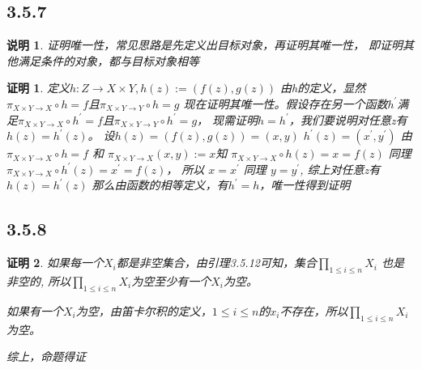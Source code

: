 \documentclass{article}
\theoremstyle{mystyle}
\newtheorem*{zremark}{说明}
\theoremstyle{zproofstyle}
\newtheorem*{zproof}{证明}
\begin{document}
\subsection*{3.5.7}
\begin{zgraytheorem}
  \begin{zremark}
    证明唯一性，常见思路是先定义出目标对象，再证明其唯一性，
    即证明其他满足条件的对象，都与目标对象相等
  \end{zremark}
\end{zgraytheorem}
\begin{zproof}
  定义$h : Z \rightarrow X \times Y, h(z) := (f(z),g(z))$
  \newline
  由h的定义，显然$\pi_{X \times Y \rightarrow X} \circ h = f$且$\pi_{X \times Y \rightarrow Y} \circ h = g$
  现在证明其唯一性。假设存在另一个函数$h^\prime$满足$\pi_{X \times Y \rightarrow X} \circ h^\prime = f$且$\pi_{X \times Y \rightarrow Y} \circ h^\prime = g$，
  现需证明$h=h^\prime$，我们要说明对任意z有$h(z)=h^\prime(z)$。
  设$h(z) = (f(z), g(z)) = (x, y)$ $h^\prime(z) = (x^\prime, y^\prime)$
  由$\pi_{X \times Y \rightarrow X} \circ h = f$ 和 $\pi_{X \times Y \rightarrow X}(x,y):=x$知
  $\pi_{X \times Y \rightarrow X} \circ h(z) = x = f(z)$
  同理 $\pi_{X \times Y \rightarrow X} \circ h^\prime(z) = x^\prime = f(z)$，
  所以 $x=x^\prime$
  同理 $y=y^\prime$,
  综上对任意z有$h(z)=h^\prime(z)$
  那么由函数的相等定义，有$h^\prime = h$，唯一性得到证明
\end{zproof}

\subsection*{3.5.8}
\begin{zproof}
  如果每一个$X_i$都是非空集合，由引理3.5.12可知，集合$\prod\limits_{1\leqslant i \leqslant n}X_i$ 也是非空的,
  所以$\prod\limits_{1\leqslant i \leqslant n}X_i$为空至少有一个$X_i$为空。

  如果有一个$X_i$为空，由笛卡尔积的定义，$1\leqslant i \leqslant n$的$x_i$不存在，所以$\prod\limits_{1\leqslant i \leqslant n}X_i$为空。

  综上，命题得证
\end{zproof}
\end{document}

